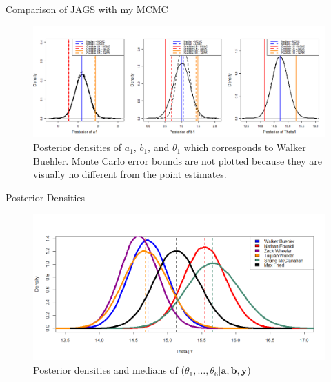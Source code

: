 \documentclass[xcolor=dvipsnames]{beamer}
\begin{document}
\begin{frame}{Comparison of JAGS with my MCMC}

\begin{figure}[h]
    \centering
    \includegraphics[scale=0.38]{figs/comp.png}
    \caption{Posterior densities of $a_1$, $b_1$, and $\theta_1$ which corresponds to Walker Buehler. Monte Carlo error bounds are not plotted because they are visually no different from the point estimates.}
    \label{fig:buehler}
\end{figure}

\end{frame}


\begin{frame}{Posterior Densities}

\begin{figure}
    \centering
    \includegraphics[scale=0.45]{figs/posterior.png}
    \caption{Posterior densities and medians of ($\theta_1, \hdots, \theta_6 | \boldsymbol{a}, \boldsymbol{b}, \boldsymbol{y}$) }
    \label{fig:post}
\end{figure}


\end{frame}

\end{document}

